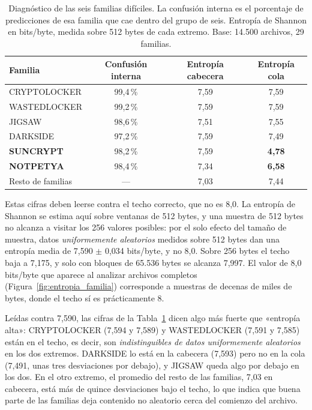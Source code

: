 \begin{table}[ht]
\centering
\caption{Diagnóstico de las seis familias difíciles. La confusión interna es el porcentaje de predicciones de esa familia que cae dentro del grupo de seis. Entropía de Shannon en bits/byte, medida sobre 512 bytes de cada extremo. Base: 14.500 archivos, 29 familias.}
\label{tab:exp2c_dificiles}
\begin{tabular}{|l|c|c|c|}
\hline
\textbf{Familia} & \textbf{Confusión interna} & \textbf{Entropía cabecera} & \textbf{Entropía cola} \\
\hline
CRYPTOLOCKER & 99,4\,\% & 7,59 & 7,59 \\
WASTEDLOCKER & 99,2\,\% & 7,59 & 7,59 \\
JIGSAW & 98,6\,\% & 7,51 & 7,55 \\
DARKSIDE & 97,2\,\% & 7,59 & 7,49 \\
\textbf{SUNCRYPT} & 98,2\,\% & 7,59 & \textbf{4,78} \\
\textbf{NOTPETYA} & 98,4\,\% & 7,34 & \textbf{6,58} \\
\hline
Resto de familias & --- & 7,03 & 7,44 \\
\hline
\end{tabular}
\end{table}

Estas cifras deben leerse contra el techo correcto, que no es 8,0. La entropía de Shannon se estima aquí sobre ventanas de 512 bytes, y una muestra de 512 bytes no alcanza a visitar los 256 valores posibles: por el solo efecto del tamaño de muestra, datos \textit{uniformemente aleatorios} medidos sobre 512 bytes dan una entropía media de 7,590 $\pm$ 0,034 bits/byte, y no 8,0. Sobre 256 bytes el techo baja a 7,175, y solo con bloques de 65.536 bytes se alcanza 7,997. El valor de 8,0 bits/byte que aparece al analizar archivos completos (Figura~\ref{fig:entropia_familia}) corresponde a muestras de decenas de miles de bytes, donde el techo sí es prácticamente 8.

Leídas contra 7,590, las cifras de la Tabla~\ref{tab:exp2c_dificiles} dicen algo más fuerte que «entropía alta»: CRYPTOLOCKER (7,594 y 7,589) y WASTEDLOCKER (7,591 y 7,585) están en el techo, es decir, son \textit{indistinguibles de datos uniformemente aleatorios} en los dos extremos. DARKSIDE lo está en la cabecera (7,593) pero no en la cola (7,491, unas tres desviaciones por debajo), y JIGSAW queda algo por debajo en los dos. En el otro extremo, el promedio del resto de las familias, 7,03 en cabecera, está más de quince desviaciones bajo el techo, lo que indica que buena parte de las familias deja contenido no aleatorio cerca del comienzo del archivo.

